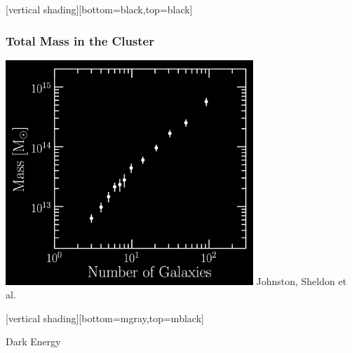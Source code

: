 \documentclass{beamer}
\begin{document}
{
    [vertical shading][bottom=black,top=black]


    \frame
    {
        \frametitle{Total Mass in the Cluster}

        \begin{center}
            \includegraphics[width=0.7\textwidth]{mass-rich-plot-icolors.png}
            \newline
            \hfill {\color{gold} Johnston, Sheldon et al.}
        \end{center}
    }
    [vertical shading][bottom=mgray,top=mblack]
}

\frame
{

    {\Huge Dark Energy }

}
\end{document}
